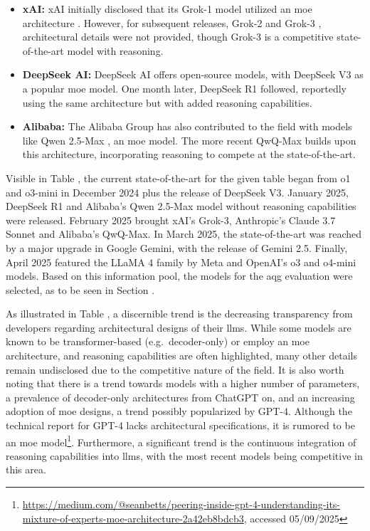 \begin{itemize}
    \item \textbf{xAI:} xAI initially disclosed that its Grok-1 model utilized an \ac{moe} architecture \cite{xai_open_2024}. However, for subsequent releases, Grok-2 \cite{xai_grok-2_2024} and Grok-3 \cite{xai_grok_2025}, architectural details were not provided, though Grok-3 is a competitive state-of-the-art model with reasoning.

    \item \textbf{DeepSeek AI:} DeepSeek AI offers open-source models, with DeepSeek V3 \cite{deepseek-ai_deepseek-v3_2025} as a popular \ac{moe} model. One month later, DeepSeek R1 \cite{deepseek-ai_deepseek-r1_2025} followed, reportedly using the same architecture but with added reasoning capabilities.

    \item \textbf{Alibaba:} The Alibaba Group has also contributed to the field with models like Qwen 2.5-Max \cite{team_qwen25-max_2025}, an \ac{moe} model. The more recent QwQ-Max \cite{team_thinkthink_2025} builds upon this architecture, incorporating reasoning to compete at the state-of-the-art.
\end{itemize}

\pagebreak

Visible in Table , the current state-of-the-art for the given table began from o1 and o3-mini in December 2024 plus the release of DeepSeek V3. January 2025, DeepSeek R1 and Alibaba's Qwen 2.5-Max model without reasoning capabilities were released. February 2025 brought xAI's Grok-3, Anthropic's Claude 3.7 Sonnet and Alibaba's QwQ-Max. In March 2025, the state-of-the-art was reached by a major upgrade in Google Gemini, with the release of Gemini 2.5. Finally, April 2025 featured the LLaMA 4 family by Meta and OpenAI's o3 and o4-mini models. Based on this information pool, the models for the \ac{aqg} evaluation were selected, as to be seen in Section . 

 As illustrated in Table , a discernible trend is the decreasing transparency from developers regarding architectural designs of their \ac{llms}. While some models are known to be transformer-based (e.g.\ decoder-only) or employ an \ac{moe} architecture, and reasoning capabilities are often highlighted, many other details remain undisclosed due to the competitive nature of the field. It is also worth noting that there is a trend towards models with a higher number of parameters, a prevalence of decoder-only architectures from ChatGPT on, and an increasing adoption of \ac{moe} designs, a trend possibly popularized by GPT-4. Although the technical report for GPT-4 \cite{openai_gpt-4_2024} lacks architectural specifications, it is rumored to be an \ac{moe} model\footnote{\url{https://medium.com/@seanbetts/peering-inside-gpt-4-understanding-its-mixture-of-experts-moe-architecture-2a42eb8bdcb3}, accessed 05/09/2025}. Furthermore, a significant trend is the continuous integration of reasoning capabilities into \ac{llms}, with the most recent models being competitive in this area.

